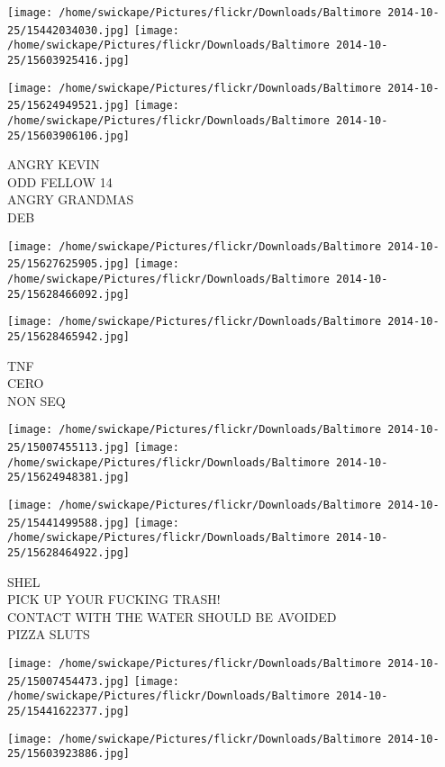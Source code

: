 \documentclass[10pt,letterpaper]{article}
\begin{document}
\texttt{[image: /home/swickape/Pictures/flickr/Downloads/Baltimore 2014-10-25/15442034030.jpg]}
\texttt{[image: /home/swickape/Pictures/flickr/Downloads/Baltimore 2014-10-25/15603925416.jpg]}

\texttt{[image: /home/swickape/Pictures/flickr/Downloads/Baltimore 2014-10-25/15624949521.jpg]}
\texttt{[image: /home/swickape/Pictures/flickr/Downloads/Baltimore 2014-10-25/15603906106.jpg]}

ANGRY KEVIN\\
ODD FELLOW 14\\
ANGRY GRANDMAS\\
DEB
\pagebreak

\texttt{[image: /home/swickape/Pictures/flickr/Downloads/Baltimore 2014-10-25/15627625905.jpg]}
\texttt{[image: /home/swickape/Pictures/flickr/Downloads/Baltimore 2014-10-25/15628466092.jpg]}

\vspace{0.25in}
\texttt{[image: /home/swickape/Pictures/flickr/Downloads/Baltimore 2014-10-25/15628465942.jpg]}

TNF\\
CERO\\
NON SEQ
\pagebreak

\texttt{[image: /home/swickape/Pictures/flickr/Downloads/Baltimore 2014-10-25/15007455113.jpg]}
\texttt{[image: /home/swickape/Pictures/flickr/Downloads/Baltimore 2014-10-25/15624948381.jpg]}

\texttt{[image: /home/swickape/Pictures/flickr/Downloads/Baltimore 2014-10-25/15441499588.jpg]}
\texttt{[image: /home/swickape/Pictures/flickr/Downloads/Baltimore 2014-10-25/15628464922.jpg]}

SHEL\\
PICK UP YOUR FUCKING TRASH!\\
CONTACT WITH THE WATER SHOULD BE AVOIDED\\
PIZZA SLUTS
\pagebreak

\texttt{[image: /home/swickape/Pictures/flickr/Downloads/Baltimore 2014-10-25/15007454473.jpg]}
\texttt{[image: /home/swickape/Pictures/flickr/Downloads/Baltimore 2014-10-25/15441622377.jpg]}

\vspace{0.25in}
\texttt{[image: /home/swickape/Pictures/flickr/Downloads/Baltimore 2014-10-25/15603923886.jpg]}
\end{document}

